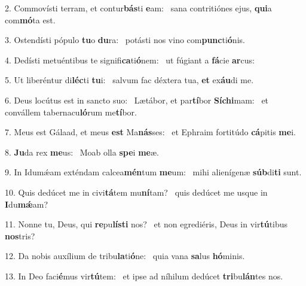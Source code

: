 2. Commovísti terram, et contur\textbf{bás}ti \textbf{e}am: \ast\  sana contritiónes ejus, \textbf{qui}a com\textbf{mó}ta est.\

3. Ostendísti pópulo \textbf{tu}o \textbf{du}ra: \ast\  potásti nos vino com\textbf{punc}ti\textbf{ó}nis.\

4. Dedísti metuéntibus te signifi\textbf{ca}ti\textbf{ó}nem: \ast\  ut fúgiant a \textbf{fá}cie \textbf{ar}cus:\

5. Ut liberéntur di\textbf{léc}ti \textbf{tu}i: \ast\  salvum fac déxtera tua, \textbf{et} ex\textbf{áu}di me.\

6. Deus locútus est in sancto suo: \dag\  Lætábor, et par\textbf{tí}bor \textbf{Sí}\textbf{chi}mam: \ast\  et convállem tabernacu\textbf{ló}rum me\textbf{tí}bor.\

7. Meus est Gálaad, et meus \textbf{est} Ma\textbf{nás}ses: \ast\  et Ephraim fortitúdo \textbf{cá}pitis \textbf{me}i.\

8. \textbf{Ju}da rex \textbf{me}us: \ast\  Moab olla \textbf{spe}i \textbf{me}æ.\

9. In Idumǽam exténdam calcea\textbf{mén}tum \textbf{me}um: \ast\  mihi alienígenæ \textbf{súb}di\textbf{ti} sunt.\

10. Quis dedúcet me in civi\textbf{tá}tem mu\textbf{ní}tam? \ast\  quis dedúcet me usque in \textbf{I}du\textbf{mǽ}am?\

11. Nonne tu, Deus, qui \textbf{re}pu\textbf{lís}\textbf{ti} nos? \ast\  et non egrediéris, Deus in vir\textbf{tú}tibus \textbf{nos}tris?\

12. Da nobis auxílium de tribu\textbf{la}ti\textbf{ó}ne: \ast\  quia vana \textbf{sa}lus \textbf{hó}minis.\

13. In Deo faci\textbf{é}mus vir\textbf{tú}tem: \ast\  et ipse ad níhilum dedúcet \textbf{tri}bu\textbf{lán}tes nos.\

